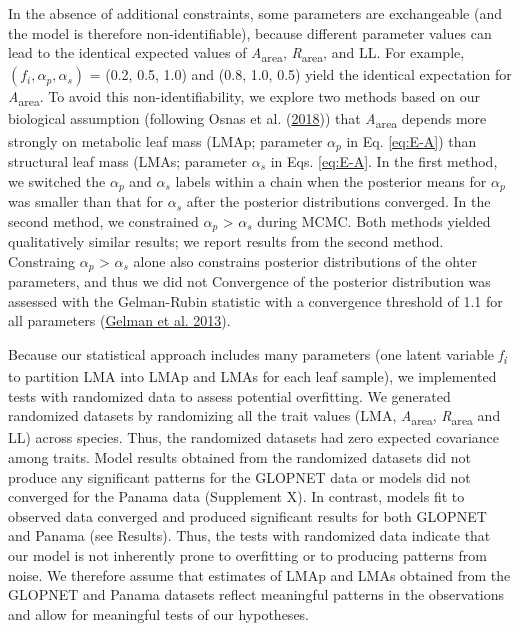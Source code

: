 \documentclass[
  12pt,
  a4paper,
,tablecaptionabove
]{scrartcl}
\begin{document}
In the absence of additional constraints, some parameters are exchangeable (and the model is therefore non-identifiable), because different parameter values can lead to the identical expected values of \emph{A}\textsubscript{area}, \emph{R}\textsubscript{area}, and LL.
For example, \((f_i, \alpha_p, \alpha_s)\) = (0.2, 0.5, 1.0) and (0.8, 1.0, 0.5) yield the identical expectation for \emph{A}\textsubscript{area}.
To avoid this non-identifiability, we explore two methods based on our biological assumption (following Osnas et al. (\protect\hyperlink{ref-Osnas2018}{2018})) that \emph{A}\textsubscript{area} depends more strongly on metabolic leaf mass (LMAp; parameter \(\alpha_p\) in Eq. \eqref{eq:E-A}) than structural leaf mass (LMAs; parameter \(\alpha_s\) in Eqs. \eqref{eq:E-A}.
In the first method, we switched the \(\alpha_p\) and \(\alpha_s\) labels within a chain when the posterior means for \(\alpha_p\) was smaller than that for \(\alpha_s\) after the posterior distributions converged.
In the second method, we constrained \(\alpha_p\) \textgreater{} \(\alpha_s\) during MCMC.
Both methods yielded qualitatively similar results; we report results from the second method.
Constraing \(\alpha_p\) \textgreater{} \(\alpha_s\) alone also constrains posterior distributions of the ohter parameters, and thus we did not
Convergence of the posterior distribution was assessed with the Gelman-Rubin statistic with a convergence threshold of 1.1 for all parameters (\protect\hyperlink{ref-Gelman2013}{Gelman et al. 2013}).

Because our statistical approach includes many parameters (one latent variable \emph{f\textsubscript{i}} to partition LMA into LMAp and LMAs for each leaf sample), we implemented tests with randomized data to assess potential overfitting.
We generated randomized datasets by randomizing all the trait values (LMA, \emph{A}\textsubscript{area}, \emph{R}\textsubscript{area} and LL) across species.
Thus, the randomized datasets had zero expected covariance among traits.
Model results obtained from the randomized datasets did not produce any significant patterns for the GLOPNET data or models did not converged for the Panama data (Supplement X).
In contrast, models fit to observed data converged and produced significant results for both GLOPNET and Panama (see Results).
Thus, the tests with randomized data indicate that our model is not inherently prone to overfitting or to producing patterns from noise.
We therefore assume that estimates of LMAp and LMAs obtained from the GLOPNET and Panama datasets reflect meaningful patterns in the observations and allow for meaningful tests of our hypotheses.
\end{document}
